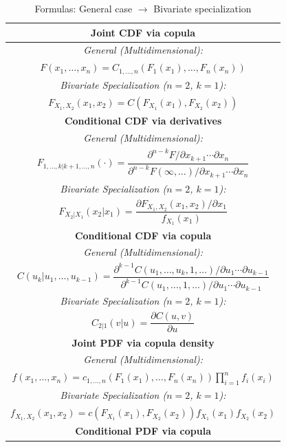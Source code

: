\begin{table}[htpb]
\centering
\small
\caption{Formulas: General case $\rightarrow$ Bivariate specialization}\label{tab:bivariate_specializations}
\begin{tabular}{|c|}
\hline
\textbf{Joint CDF via copula} \\
\hline
\textit{General (Multidimensional):} \\[2pt]
$F(x_1,\ldots,x_n) = C_{1,\ldots,n}(F_1(x_1),\ldots,F_n(x_n))$ \\[6pt]
\textit{Bivariate Specialization ($n=2$, $k=1$):} \\[2pt]
$F_{X_1,X_2}(x_1,x_2) = C(F_{X_1}(x_1), F_{X_2}(x_2))$ \\[4pt]
\hline
\textbf{Conditional CDF via derivatives} \\
\hline
\textit{General (Multidimensional):} \\[2pt]
$F_{1,\ldots,k|k+1,\ldots,n}(\cdot)=\dfrac{\partial^{n-k}F/\partial x_{k+1}\cdots\partial x_n}{\partial^{n-k}F(\infty,\ldots)/\partial x_{k+1}\cdots\partial x_n}$ \\[6pt]
\textit{Bivariate Specialization ($n=2$, $k=1$):} \\[2pt]
$F_{X_2|X_1}(x_2|x_1) = \dfrac{\partial F_{X_1,X_2}(x_1,x_2)/\partial x_1}{f_{X_1}(x_1)}$ \\[4pt]
\hline
\textbf{Conditional CDF via copula} \\
\hline
\textit{General (Multidimensional):} \\[2pt]
$C(u_k|u_1,\ldots,u_{k-1})=\dfrac{\partial^{k-1}C(u_1,\ldots,u_k,1,\ldots)/\partial u_1\cdots\partial u_{k-1}}{\partial^{k-1}C(u_1,\ldots,1,\ldots)/\partial u_1\cdots\partial u_{k-1}}$ \\[6pt]
\textit{Bivariate Specialization ($n=2$, $k=1$):} \\[2pt]
$C_{2|1}(v|u) = \dfrac{\partial C(u,v)}{\partial u}$ \\[4pt]
\hline
\textbf{Joint PDF via copula density} \\
\hline
\textit{General (Multidimensional):} \\[2pt]
$f(x_1,\ldots,x_n) = c_{1,\ldots,n}(F_1(x_1),\ldots,F_n(x_n))\prod_{i=1}^n f_i(x_i)$ \\[6pt]
\textit{Bivariate Specialization ($n=2$, $k=1$):} \\[2pt]
$f_{X_1,X_2}(x_1,x_2) = c(F_{X_1}(x_1),F_{X_2}(x_2))f_{X_1}(x_1)f_{X_2}(x_2)$ \\[4pt]
\hline
\textbf{Conditional PDF via copula} \\
\hline

\end{tabular}
\end{table}
